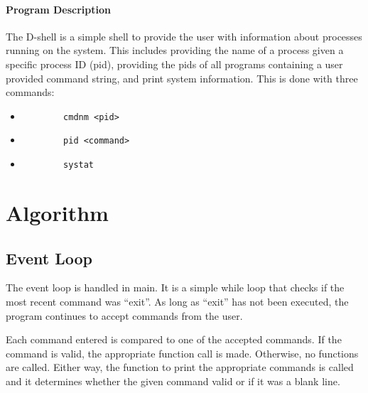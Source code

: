 \documentclass[11pt]{article}
\begin{document}
\maketitle


\begin{multicols}{2}

\paragraph{Program Description}
The D-shell is a simple shell to provide the user with information about processes running on the system. This includes providing the name of a process given a specific process ID (pid), providing the pids of all programs containing a user provided command string, and print system information. This is done with three commands:
\begin{itemize}
\item 	\begin{verbatim}
		cmdnm <pid>
		\end{verbatim}
		
\item 	\begin{verbatim}
		pid <command>
		\end{verbatim}
		
\item 	\begin{verbatim}
		systat
		\end{verbatim}	
\end{itemize}

\section{Algorithm}\label{algorithm}
\subsection{Event Loop}\label{event_loop}
The event loop is handled in main. It is a simple while loop that checks if the most recent command was ``exit''. As long as ``exit'' has not been executed, the program continues to accept commands from the user. 

Each command entered is compared to one of the accepted commands. If the command is valid, the appropriate function call is made. Otherwise, no functions are called. Either way, the function to print the appropriate commands is called and it determines whether the given command valid or if it was a blank line.


\end{multicols}
\end{document}
